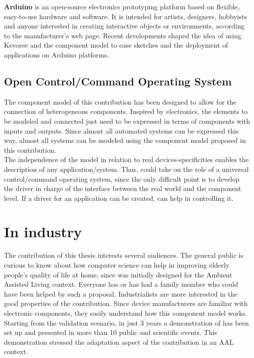 {\bf Arduino} is an open-source electronics prototyping platform based on flexible, easy-to-use hardware and software. It is intended for artists, designers, hobbyists and anyone interested in creating interactive objects or environments, according to the manufacturer's web page. Recent developments shaped the idea of using Kevoree and the component model to ease sketches and the deployment of applications on Arduino platforms.


\subsection{Open Control/Command Operating System}

The component model of this contribution has been designed to allow for the connection of heterogeneous components. Inspired by electronics, the elements to be modeled and connected just need to be expressed in terms of components with inputs and outputs. Since almost all automated systems can be expressed this way, almost all systems can be modeled using the component model proposed in this contribution.\\
The independence of the model in relation to real devices-specificities enables the description of any application/system. Thus, \enti{} could take on the role of a universal control/command operating system, since the only difficult point is to develop the driver in charge of the interface between the real world and the component level. If a driver for an application can be created, \enti{} can help in controlling it.


\section{In industry}
\label{ch:industrialPerspectives}

The contribution of this thesis interests several audiences. The general public is curious to know about how computer science can help in improving elderly people's quality of life at home, since \enti{} was initially designed for the Ambient Assisted Living context. Everyone has or has had a family member who could have been helped by such a proposal. Industrialists are more interested in the good properties of the contribution. Since device manufacturers are familiar with electronic components, they easily understand how this component model works.\\
Starting from the validation scenario, in just 3 years a demonstration of \enti{} has been set up and presented in more than 10 public and scientific events. This demonstration stressed the adaptation aspect of the contribution in an AAL context.


